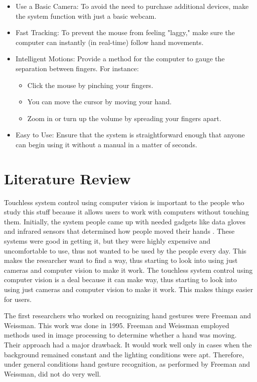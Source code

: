 \documentclass[conference]{IEEEtran}
\begin{document}
\begin{itemize}
\item Use a Basic Camera: To avoid the need to purchase additional devices, make the system function with just a basic webcam.
\item Fast Tracking: To prevent the mouse from feeling "laggy," make sure the computer can instantly (in real-time) follow hand movements.
\item Intelligent Motions: Provide a method for the computer to gauge the separation between fingers. For instance:
\begin{itemize}
\item Click the mouse by pinching your fingers.
\item You can move the cursor by moving your hand.
\item Zoom in or turn up the volume by spreading your fingers apart.
\end{itemize}
\item Easy to Use: Ensure that the system is straightforward enough that anyone can begin using it without a manual in a matter of seconds.
\end{itemize}

\section{Literature Review}
Touchless system control using computer vision is important to the people who study this stuff because it allows users to work with computers without touching them. Initially, the system people came up with needed gadgets like data gloves and infrared sensors that determined how people moved their hands \cite{ref8}. These systems were good in getting it, but they were highly expensive and uncomfortable to use, thus not wanted to be used by the people every day. This makes the researcher want to find a way, thus starting to look into using just cameras and computer vision to make it work. The touchless system control using computer vision is a deal because it can make way, thus starting to look into using just cameras and computer vision to make it work. This makes things easier for users.

The first researchers who worked on recognizing hand gestures were Freeman and Weissman. This work was done in 1995. Freeman and Weissman employed methods used in image processing to determine whether a hand was moving. Their approach had a major drawback. It would work well only in cases when the background remained constant and the lighting conditions were apt. Therefore, under general conditions hand gesture recognition, as performed by Freeman and Weissman, did not do very well.
\end{document}

